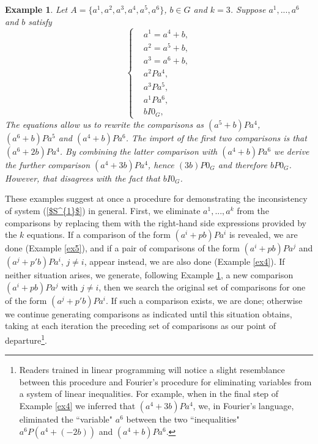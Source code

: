 \documentclass[pdflatex,sn-apa,11pt]{sn-jnl}%
\newtheorem{example}{Example}%
\begin{document}
\begin{example}
\label{ex6}
Let $A = \{a^1, a^2, a^3, a^4, a^5, a^6\}$, $b \in G$ and $k = 3$. Suppose $a^1, ..., a^6$ and $b$ satisfy
\begin{equation*}
  \left\{
    \begin{aligned}
      & a^1 = a^{4} + b, \\
      & a^2 = a^{5} + b, \\
      & a^3 = a^{6} + b, \\
      & a^{2}Pa^{4}, \\
      & a^{3}Pa^{5}, \\
      & a^{1}Pa^{6}, \\
      & bI{0_G},
    \end{aligned}
  \right.
\end{equation*}
The equations allow us to rewrite the comparisons as $(a^5 + b)Pa^4$, $(a^6+b)Pa^5$ and $(a^4 + b)Pa^{6}$. The import of the first two comparisons is that $(a^6 + 2b)Pa^{4}$. By combining the latter comparison with $(a^4 + b)Pa^6$ we derive the further comparison $(a^4 + 3b)Pa^{4}$, hence $(3b)P0_G$ and therefore $bP0_G$. However, that disagrees with the fact that $bI0_G$. 
\end{example}

These examples suggest at once a procedure for demonstrating the inconsistency of system (\ref{$S^{1}$}) in general. First, we eliminate $a^1, ..., a^k$ from the comparisons by replacing them with the right-hand side expressions provided by the $k$ equations. If a comparison of the form $(a^{i}+pb)Pa^{i}$ is revealed, we are done (Example \ref{ex5}), and if a pair of comparisons of the form $(a^{i}+pb)Pa^{j}$ and $(a^{j}+p'b)Pa^{i}$, $j \neq i$, appear instead, we are also done (Example \ref{ex4}). If neither situation arises, we generate, following Example \ref{ex6}, a new comparison $(a^{i}+pb)Pa^{j}$ with $j \neq i$, then we search the original set of comparisons for one of the form $(a^{j}+p'b)Pa^{i}$. If such a comparison exists, we are done; otherwise we continue generating comparisons as indicated until this situation obtains, taking at each iteration the preceding set of comparisons as our point of departure\footnote{Readers trained in linear programming will notice a slight resemblance between this procedure and Fourier's procedure \citep{williams1986fourier} for eliminating variables from a system of linear inequalities. For example, when in the final step of Example \ref{ex4} we inferred that $(a^{4}+ 3b)Pa^{4}$, we, in Fourier's language, eliminated the ``variable" $a^{6}$ between the two ``inequalities" $a^{6}P(a^{4} + (-2b))$ and $(a^{4} + b)Pa^{6}$.}.
\end{document}
